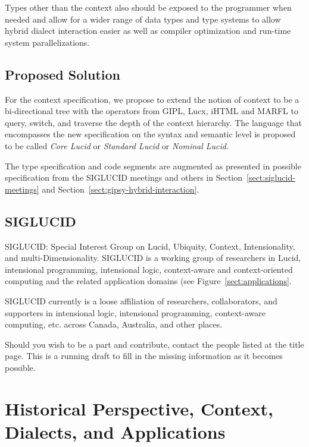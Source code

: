 \documentclass{easychair}
\newcommand{\xf}[1]{Figure~\ref{#1}}
\newcommand{\xs}[1]{Section~\ref{#1}}
\newcommand{\gipl}{{GIPL\index{GIPL}}}
\newcommand{\lucx}{{Lucx\index{Lucx}}}
\newcommand{\marfl}{MARFL\index{MARFL}}
\begin{document}
Types other than the context also should be exposed to the
programmer when needed and allow for a wider range of data
types and type systems to allow hybrid dialect interaction
easier as well as compiler optimization and run-time system
parallelizations.




\subsection{Proposed Solution}

For the context specification, we propose to extend the notion of context to be a bi-directional
tree with the operators from {\gipl}, {\lucx}, iHTML and {\marfl} to query,
switch, and traverse the depth of the context hierarchy. The language
that encompasses the new specification on the syntax and semantic
level is proposed to be called {\em Core Lucid} or {\em Standard Lucid} or {\em Nominal Lucid}. 

The type specification and code segments are augmented as presented in possible
specification from the SIGLUCID meetings and others in \xs{sect:siglucid-meetings}
and \xs{sect:gipsy-hybrid-interaction}.




\subsection{SIGLUCID}
\label{sect:siglucid}

SIGLUCID: Special Interest Group on Lucid, Ubiquity,
Context, Intensionality, and multi-Dimensionality.
SIGLUCID is a working group of researchers in Lucid,
intensional programming, intensional logic, context-aware
and context-oriented computing and the related application
domains (see \xf{sect:applications}.

\noindent
SIGLUCID currently is a loose affiliation of researchers,
collaborators, and supporters in intensional logic, intensional
programming, context-aware computing, etc. across Canada,
Australia, and other places.

Should you wish to be a part and contribute, contact the people listed
at the title page. This is a running draft to fill in the missing
information as it becomes possible.




\section{Historical Perspective, Context, Dialects, and Applications}
\label{sect:history}
\end{document}
